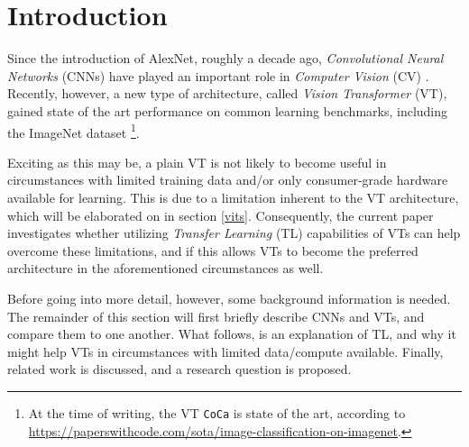 \section{Introduction}
Since the introduction of AlexNet, roughly a decade ago, \textit{Convolutional Neural Networks} (CNNs) have played an important role in \textit{Computer Vision} (CV) \citep{krizhevsky2012imagened}. Recently, however, a new type of architecture, called \textit{Vision Transformer} (VT), gained state of the art performance on common learning benchmarks, including the ImageNet dataset \citep{deng2009imagenet}\footnote{At the time of writing, the VT \texttt{CoCa} is state of the art, according to \url{https://paperswithcode.com/sota/image-classification-on-imagenet}.}.

Exciting as this may be, a plain VT is not likely to become useful in circumstances with limited training data and/or only consumer-grade hardware available for learning. This is due to a limitation inherent to the VT architecture, which will be elaborated on in section \ref{vits}. Consequently, the current paper investigates whether utilizing \textit{Transfer Learning} (TL) capabilities of VTs can help overcome these limitations, and if this allows VTs to become the preferred architecture in the aforementioned circumstances as well.

Before going into more detail, however, some background information is needed. The remainder of this section will first briefly describe CNNs and VTs, and compare them to one another. What follows, is an explanation of TL, and why it might help VTs in circumstances with limited data/compute available. Finally, related work is discussed, and a research question is proposed.



